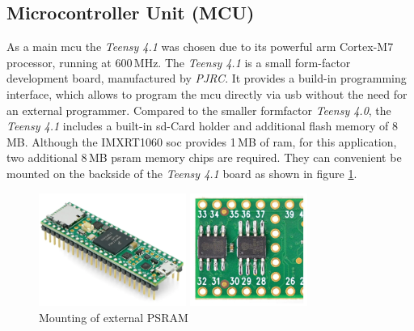 \subsection{Microcontroller Unit (MCU)}
As a main \acrshort{mcu} the \textit{Teensy 4.1} was chosen due to its powerful \acrshort{arm} Cortex-M7 processor, running at 600\,MHz.
The \textit{Teensy 4.1} is a small form-factor development board, manufactured by \textit{PJRC}.
It provides a build-in programming interface, which allows to program the \acrshort{mcu} directly via \acrshort{usb} without the need for an external programmer.
Compared to the smaller formfactor \textit{Teensy 4.0}, the \textit{Teensy 4.1} includes a built-in \acrshort{sd}-Card holder and additional flash memory of 8\,MB.
Although the IMXRT1060 \acrshort{soc} provides 1\,MB of \acrshort{ram}, for this application, two additional 8\,MB \acrshort{psram} memory chips are required.
They can convenient be mounted on the backside of the \textit{Teensy 4.1} board as shown in figure \ref{fig:teensy_psram}.
\begin{figure}[h!]
	\centering
	\begin{minipage}{0.49\textwidth}
		\centering
		\includegraphics[height=3.7cm]{images/4_design_acquisition_system/teensy_image.png}
		\vspace{-0.2cm}
		\caption{Teensy 4.1}
		\label{fig:teensy_4_1}
	\end{minipage}
	\begin{minipage}{0.49\textwidth}
		\centering
		\includegraphics[height=3.7cm]{images/4_design_acquisition_system/teensy_psram.png}
		\vspace{-0.2cm}
		\caption{Mounting of external PSRAM}
		\label{fig:teensy_psram}
	\end{minipage}
\end{figure}
\newpage

